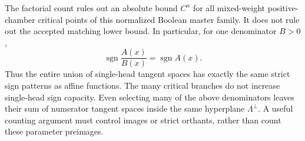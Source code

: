 \documentclass[11pt]{article}
\begin{document}
The factorial count rules out an absolute bound $C^n$ for all mixed-weight
positive-chamber critical points of this normalized Boolean master family.
It does not rule out the accepted matching lower bound. In particular, for
one denominator $B>0$,
\[
 \operatorname{sgn}\frac{A(x)}{B(x)}=\operatorname{sgn}A(x).
\]
Thus the entire union of single-head tangent spaces has exactly the same
strict sign patterns as affine functions. The many critical branches do
not increase single-head sign capacity. Even selecting many of the above
denominators leaves their sum of numerator tangent spaces inside the same
hyperplane $\Lambda^\perp$. A useful counting argument must control images
or strict orthants, rather than count these parameter preimages.
\end{document}
